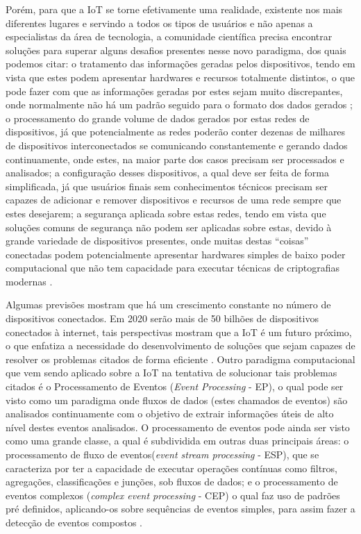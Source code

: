 \documentclass[ti,table]{texufpel} %
\begin{document}
Porém, para que a IoT se torne efetivamente uma realidade, existente nos mais diferentes lugares e servindo a todos os tipos de usuários e não apenas a especialistas da área de tecnologia, a comunidade científica precisa encontrar soluções para superar alguns desafios presentes nesse novo paradigma, dos quais podemos citar: o tratamento das informações geradas pelos dispositivos, tendo em vista que estes podem apresentar hardwares e recursos totalmente distintos, o que pode fazer com que as informações geradas por estes sejam muito discrepantes, onde normalmente não há um padrão seguido para o formato dos dados gerados \cite{agrawal2013survey}; o processamento do grande volume de dados gerados por estas redes de dispositivos, já que potencialmente as redes poderão conter dezenas de milhares de dispositivos interconectados se comunicando constantemente e gerando dados continuamente, onde estes, na maior parte dos casos precisam ser processados e analisados; a configuração desses dispositivos, a qual deve ser feita de forma simplificada, já que usuários finais sem conhecimentos técnicos precisam ser capazes de adicionar e remover dispositivos e recursos de uma rede sempre que estes desejarem; a segurança aplicada sobre estas redes, tendo em vista que soluções comuns de segurança não podem ser aplicadas sobre estas,  devido à grande variedade de dispositivos presentes, onde muitas destas ``coisas'' conectadas podem potencialmente apresentar hardwares simples de baixo poder computacional que não tem capacidade para executar técnicas de criptografias modernas \cite{agrawal2013survey}. 

  

  

Algumas previsões mostram que há um crescimento constante no número de dispositivos conectados. Em 2020 serão mais de 50 bilhões de dispositivos conectados à internet, tais perspectivas mostram que a IoT é um futuro próximo, o que enfatiza a necessidade do desenvolvimento de soluções que sejam capazes de resolver os problemas citados de forma eficiente \cite{xavier2016smart}. Outro paradigma computacional que vem sendo aplicado sobre a IoT na tentativa de solucionar tais problemas citados é o  Processamento de Eventos (\textit{Event Processing} - EP), o qual pode ser visto como um paradigma onde fluxos de dados (estes chamados de eventos) são analisados continuamente com o objetivo de extrair informações úteis de alto nível destes eventos analisados. O processamento de eventos pode ainda ser visto como uma grande classe, a qual é subdividida em outras duas principais áreas: o processamento de fluxo de eventos(\textit{event stream processing} - ESP), que se caracteriza por ter a capacidade de executar operações contínuas como filtros, agregações, classificações e junções, sob fluxos de dados; e o processamento de eventos complexos (\textit{complex event processing} - CEP) o qual faz uso de padrões pré definidos, aplicando-os sobre sequências de eventos simples, para assim fazer a detecção de eventos compostos \cite{dayarathna2018recent}. 
\end{document}
